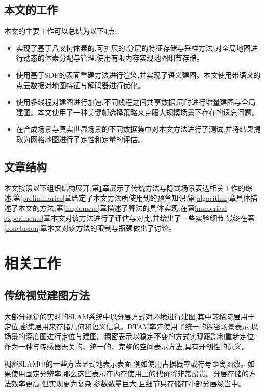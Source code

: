 \subsection{本文的工作}
本文的主要工作可以总结为以下4点:
\begin{itemize}
	\item 实现了基于八叉树体素的,可扩展的,分层的特征存储与采样方法,对全局地图进行动态的体素分配与管理,使用有限内存实现地图细节存储。
	\item 使用基于SDF的表面重建方法进行渲染,并实现了语义建图。本文使用带语义的点云数据对地图特征与解码器进行优化。
	\item 使用多线程对建图进行加速,不同线程之间共享数据,同时进行增量建图与全局建图。本文使用了一种关键帧选择策略来克服大规模场景下存在的遗忘问题。
	\item 在合成场景与真实世界场景的不同数据集中对本文方法进行了测试,并将结果提取为网格地图进行了定性和定量的评估。
\end{itemize}


\subsection{文章结构}
本文按照以下组织结构展开:第\ref{related work}章展示了传统方法与隐式场景表达相关工作的综述;第\ref{preliminaries}章给定了本文方法所使用到的预备知识;第\ref{algorithm}章具体描述了本文的方法;第\ref{implement}章描述了算法的具体实现;在第\ref{numerical experiments}章本文对该方法进行了评估与对比,并给出了一些实验细节;最终在第\ref{conclusion}章本文对该方法的限制与瓶颈做出了讨论。

\clearpage
\section{相关工作}\label{related work}

\subsection{传统视觉建图方法}
大部分视觉的实时的SLAM系统中以分层方式对环境进行建图,其中较稀疏层用于定位,密集层用来存储几何和语义信息。DTAM\cite{DTAM}率先使用了统一的稠密场景表示,以场景的深度图进行定位与建图。稠密表示以稳定不变的方式实现跟踪和重新定位,作为一种与传感器无关的、统一的、完整的空间表示方法,具有开创性的意义。

稠密SLAM中的一些方法显式地表示表面,例如使用占据概率或符号距离函数。如果使用固定分辨率\cite{tradition1},那么这些表示在内存使用上的代价将非常昂贵。分层存储\cite{tradition2}的方法效率更高,但实现更为复杂,参数数量巨大,且细节只存储在小部分层级当中。

